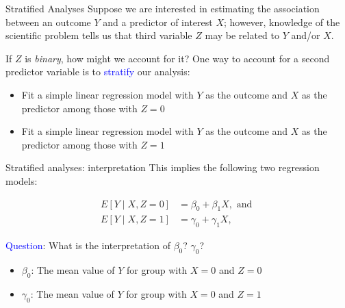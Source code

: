 \documentclass[10pt,t]{beamer}
\begin{document}
\begin{frame}{Stratified Analyses}
Suppose we are interested in estimating the association between an outcome $Y$ and a predictor of interest $X$; however, knowledge of the scientific problem tells us that third variable $Z$ may be related to $Y$ and/or $X$.

\vspace{0.3cm}

If $Z$ is \textit{binary}, how might we account for it? \pause One way to account for a second predictor variable is to \textcolor{blue}{stratify} our analysis:

\vspace{0.3cm}

\begin{itemize}
	\item Fit a simple linear regression model with $Y$ as the outcome and $X$ as the predictor among those with $Z = 0$
	\item Fit a simple linear regression model with $Y$ as the outcome and $X$ as the predictor among those with $Z = 1$
\end{itemize}
\end{frame}

\begin{frame}{Stratified analyses: interpretation}
This implies the following two regression models:

\begin{align*}
E[Y \mid X, Z = 0] & = \beta_0 + \beta_1 X, \text{ and } \\
E[Y \mid X, Z = 1] & = \gamma_0 + \gamma_1 X,
\end{align*} \pause

\textcolor{blue}{Question}: What is the interpretation of $\beta_0$? $\gamma_0$? \pause

\vspace{0.3cm}

\begin{itemize}
	\item $\beta_0$: The mean value of $Y$ for group with $X  = 0$ and $Z = 0$ \pause
	\item $\gamma_0$: The mean value of $Y$ for group with $X = 0$ and $Z = 1$
\end{itemize}
\end{frame}
\end{document}
